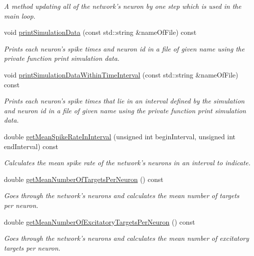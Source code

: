 \begin{DoxyCompactItemize}
\begin{DoxyCompactList}\small\item\em A method updating all of the network's neuron by one step which is used in the main loop. \end{DoxyCompactList}\item 
void \hyperlink{classNetwork_a222e084554183af355833cda07a83877}{print\-Simulation\-Data} (const std\-::string \&name\-Of\-File) const 
\begin{DoxyCompactList}\small\item\em Prints each neuron's spike times and neuron id in a file of given name using the private function print simulation data. \end{DoxyCompactList}\item 
void \hyperlink{classNetwork_a8909c07d0e6e292f5ca54e56a797ebe0}{print\-Simulation\-Data\-Within\-Time\-Interval} (const std\-::string \&name\-Of\-File) const 
\begin{DoxyCompactList}\small\item\em Prints each neuron's spike times that lie in an interval defined by the simulation and neuron id in a file of given name using the private function print simulation data. \end{DoxyCompactList}\item 
double \hyperlink{classNetwork_ac82435bb56bf5eabfdd3e3f4afadea2b}{get\-Mean\-Spike\-Rate\-In\-Interval} (unsigned int begin\-Interval, unsigned int end\-Interval) const 
\begin{DoxyCompactList}\small\item\em Calculates the mean spike rate of the network's neurons in an interval to indicate. \end{DoxyCompactList}\item 
double \hyperlink{classNetwork_a2e2531cb63d1b17bd4ce29a675b12d74}{get\-Mean\-Number\-Of\-Targets\-Per\-Neuron} () const 
\begin{DoxyCompactList}\small\item\em Goes through the network's neurons and calculates the mean number of targets per neuron. \end{DoxyCompactList}\item 
double \hyperlink{classNetwork_a2f3ab248d3453b67f1545bf2e310538f}{get\-Mean\-Number\-Of\-Excitatory\-Targets\-Per\-Neuron} () const 
\begin{DoxyCompactList}\small\item\em Goes through the network's neurons and calculates the mean number of excitatory targets per neuron. \end{DoxyCompactList}\end{DoxyCompactItemize}
